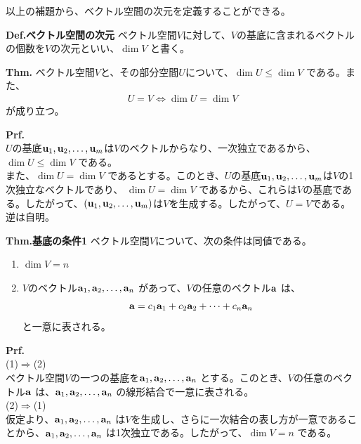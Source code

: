 \documentclass[a4paper,11pt]{jsarticle}
\numberwithin{equation}{section}
\begin{document}
以上の補題から、ベクトル空間の次元を定義することができる。

\begin{itembox}[l]{\textbf{Def.ベクトル空間の次元}}
  ベクトル空間$V$に対して、$V$の基底に含まれるベクトルの個数を$V$の次元といい、$\dim V$ と書く。
\end{itembox}

\begin{itembox}[l]{\textbf{Thm.}}
  ベクトル空間$V$と、その部分空間$U$について、$\dim U \leq \dim V$ である。また、
  \begin{align}
    U=V \Leftrightarrow \dim U = \dim V
  \end{align}
  が成り立つ。
\end{itembox}
\textbf{Prf.}\\
$U$の基底$\vb{u}_1, \vb{u}_2, \dots, \vb{u}_m$は$V$のベクトルからなり、一次独立であるから、$\dim U \leq \dim V$ である。\\
また、$\dim U = \dim V$ であるとする。このとき、$U$の基底$\vb{u}_1, \vb{u}_2, \dots, \vb{u}_m$は$V$の1次独立なベクトルであり、
$\dim U = \dim V$ であるから、これらは$V$の基底である。したがって、$(\vb{u}_1, \vb{u}_2, \dots, \vb{u}_m)$は$V$を生成する。したがって、$U=V$である。
逆は自明。\hfill\qedsymbol

\begin{itembox}[l]{\textbf{Thm.基底の条件1}}
  ベクトル空間$V$について、次の条件は同値である。
  \begin{enumerate}
    \item $\dim V = n$
    \item $V$のベクトル$\vb{a}_1, \vb{a}_2, \dots, \vb{a}_n$ があって、$V$の任意のベクトル$\vb{a}$ は、
    \begin{align}
      \vb{a} = c_1\vb{a}_1 + c_2\vb{a}_2 + \dots + c_n\vb{a}_n
    \end{align}
    と一意に表される。
  \end{enumerate}
\end{itembox}
\textbf{Prf.}\\
(1)$\Rightarrow$(2)\\
ベクトル空間$V$の一つの基底を$\vb{a}_1, \vb{a}_2, \dots, \vb{a}_n$ とする。このとき、$V$の任意のベクトル$\vb{a}$ は、$\vb{a}_1, \vb{a}_2, \dots, \vb{a}_n$ の線形結合で一意に表される。\\
(2)$\Rightarrow$(1)\\
仮定より、$\vb{a}_1, \vb{a}_2, \dots, \vb{a}_n$ は$V$を生成し、さらに一次結合の表し方が一意であることから、$\vb{a}_1, \vb{a}_2, \dots, \vb{a}_n$ は1次独立である。したがって、$\dim V = n$ である。\hfill\qedsymbol\\
\end{document}
